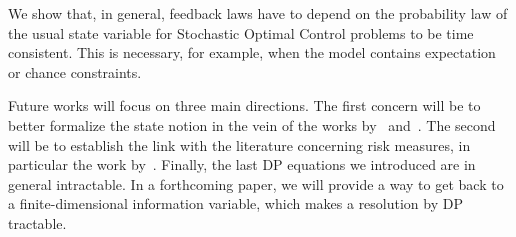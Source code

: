 \documentclass[a4paper]{amsart}
\theoremstyle{plain}
\theoremstyle{definition}
\theoremstyle{remark}
\begin{document}
We show that, in general, feedback laws have to depend on the
probability law of the usual state variable for Stochastic Optimal
Control problems to be time consistent. This is necessary, for
example, when the model contains expectation or chance
constraints.

Future works will focus on three main directions. The first
concern will be to better formalize the state notion in the vein
of the works by~\citet{Witsenhausen:1971a,Witsenhausen:1973}
and~\citet{Whittle}. The second will be to establish the link with
the literature concerning risk measures, in particular the work
by~\citet{Ruszczynski_OO_2009}. Finally, the last DP equations we
introduced are in general intractable. In a forthcoming paper, we
will provide a way to get back to a finite-dimensional information
variable, which makes a resolution by DP tractable.


\end{document}
